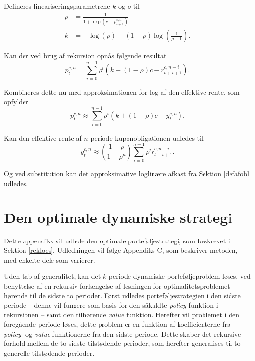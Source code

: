 \documentclass[
  a4paper,
  oneside]{memoir}
\begin{document}
Defineres lineariseringsparametrene \(k\) og \(\rho\) til
\begin{align*}
\rho&=\frac{1}{1+\exp\left(\overline{c- p_{t+1}^{c,n}}\right)}\\
k&=-\log\left(\rho\right)-\left(1-\rho\right)\log\left(\frac{1}{\rho-1}\right).
\end{align*}

Kan der ved brug af rekursion opnås følgende resultat
\begin{equation*}
p_t^{c,n}=\sum_{i=0}^{n-1} \rho^i\left(k+\left(1-\rho\right)c - r_{t+i+1}^{c,n-i}\right).
\end{equation*}

Kombineres dette nu med approksimationen for log af den effektive rente, som opfylder
\begin{equation*}
p_t^{c,n}\approx\sum_{i=0}^{n-1} \rho^i\left(k+\left(1-\rho\right)c - y_t^{c,n}\right).
\end{equation*}

Kan den effektive rente af \(n\)-periode kuponobligationen udledes til
\begin{equation*}
y_t^{c,n}\approx \left(\frac{1-\rho}{1-\rho^n}\right)\sum_{i=0}^{n-1}\rho^i r_{t+i+1}^{c,n-i}.
\end{equation*}

Og ved substitution kan det approksimative loglinære afkast fra Sektion \ref{defafobl} udledes.

\hypertarget{optdynstrategi}{%
\chapter{Den optimale dynamiske strategi}\label{optdynstrategi}}

Dette appendiks vil udlede den optimale porteføljestrategi, som beskrevet i Sektion \ref{rekloes}. Udledningen vil følge \citep{JurVic2011} Appendiks C, som beskriver metoden, med enkelte dele som varierer.

Uden tab af generalitet, kan det \(k\)-periode dynamiske porteføljeproblem løses, ved benyttelse af en rekursiv forlængelse af løsningen for optimalitetsproblemet hørende til de sidste to perioder. Først udledes porteføljestrategien i den sidste periode -- denne vil fungere som basis for den såkaldte \emph{policy}-funktion i rekursionen -- samt den tilhørende \emph{value} funktion. Herefter vil problemet i den foregående periode løses, dette problem er en funktion af koefficienterne fra \emph{policy}- og \emph{value}-funktionerne fra den sidste periode. Dette skaber det rekursive forhold mellem de to sidste tilstødende perioder, som herefter generalises til to generelle tilstødende perioder.
\end{document}
